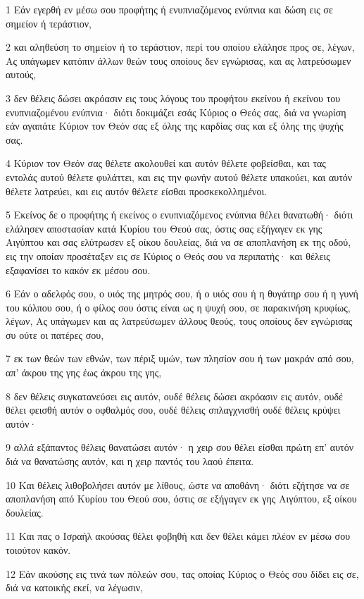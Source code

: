 \par 1 Εάν εγερθή εν μέσω σου προφήτης ή ενυπνιαζόμενος ενύπνια και δώση εις σε σημείον ή τεράστιον,
\par 2 και αληθεύση το σημείον ή το τεράστιον, περί του οποίου ελάλησε προς σε, λέγων, Ας υπάγωμεν κατόπιν άλλων θεών τους οποίους δεν εγνώρισας, και ας λατρεύσωμεν αυτούς,
\par 3 δεν θέλεις δώσει ακρόασιν εις τους λόγους του προφήτου εκείνου ή εκείνου του ενυπνιαζομένου ενύπνια· διότι δοκιμάζει εσάς Κύριος ο Θεός σας, διά να γνωρίση εάν αγαπάτε Κύριον τον Θεόν σας εξ όλης της καρδίας σας και εξ όλης της ψυχής σας.
\par 4 Κύριον τον Θεόν σας θέλετε ακολουθεί και αυτόν θέλετε φοβείσθαι, και τας εντολάς αυτού θέλετε φυλάττει, και εις την φωνήν αυτού θέλετε υπακούει, και αυτόν θέλετε λατρεύει, και εις αυτόν θέλετε είσθαι προσκεκολλημένοι.
\par 5 Εκείνος δε ο προφήτης ή εκείνος ο ενυπνιαζόμενος ενύπνια θέλει θανατωθή· διότι ελάλησεν αποστασίαν κατά Κυρίου του Θεού σας, όστις σας εξήγαγεν εκ γης Αιγύπτου και σας ελύτρωσεν εξ οίκου δουλείας, διά να σε αποπλανήση εκ της οδού, εις την οποίαν προσέταξεν εις σε Κύριος ο Θεός σου να περιπατής· και θέλεις εξαφανίσει το κακόν εκ μέσου σου.
\par 6 Εάν ο αδελφός σου, ο υιός της μητρός σου, ή ο υιός σου ή η θυγάτηρ σου ή η γυνή του κόλπου σου, ή ο φίλος σου όστις είναι ως η ψυχή σου, σε παρακινήση κρυφίως, λέγων, Ας υπάγωμεν και ας λατρεύσωμεν άλλους θεούς, τους οποίους δεν εγνώρισας συ ούτε οι πατέρες σου,
\par 7 εκ των θεών των εθνών, των πέριξ υμών, των πλησίον σου ή των μακράν από σου, απ' άκρου της γης έως άκρου της γης,
\par 8 δεν θέλεις συγκατανεύσει εις αυτόν, ουδέ θέλεις δώσει ακρόασιν εις αυτόν, ουδέ θέλει φεισθή αυτόν ο οφθαλμός σου, ουδέ θέλεις σπλαγχνισθή ουδέ θέλεις κρύψει αυτόν·
\par 9 αλλά εξάπαντος θέλεις θανατώσει αυτόν· η χειρ σου θέλει είσθαι πρώτη επ' αυτόν διά να θανατώσης αυτόν, και η χειρ παντός του λαού έπειτα.
\par 10 Και θέλεις λιθοβολήσει αυτόν με λίθους, ώστε να αποθάνη· διότι εζήτησε να σε αποπλανήση από Κυρίου του Θεού σου, όστις σε εξήγαγεν εκ γης Αιγύπτου, εξ οίκου δουλείας.
\par 11 Και πας ο Ισραήλ ακούσας θέλει φοβηθή και δεν θέλει κάμει πλέον εν μέσω σου τοιούτον κακόν.
\par 12 Εάν ακούσης εις τινά των πόλεών σου, τας οποίας Κύριος ο Θεός σου δίδει εις σε, διά να κατοικής εκεί, να λέγωσιν,
